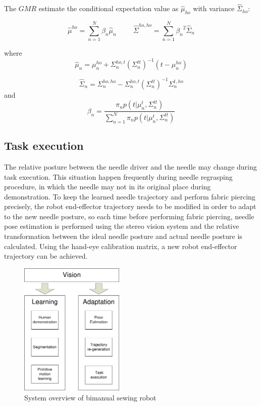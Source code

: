 The $GMR$ estimate the conditional expectation value as $\hat{\mu}_{ho}$ with variance $\hat{\Sigma}_{ho}$:

\begin{equation}
{
\hat{\mu}^{ho} = \sum_{n=1}^N{\beta_n}\hat{\mu}_{n}
}
\hspace{1cm}
{
\hat{\Sigma}^{ho,ho} = \sum_{n=1}^N{\beta_n}^2\hat{\Sigma}_{n}
}
\end{equation}

where
\begin{equation}
{
\hat{\mu}_{n} = {\mu}_{n}^{ho} + \Sigma_{n}^{ho,t}({\Sigma}_{n}^{tt})^{-1}(t-{\mu}_{n}^{ho})
}
\end{equation}

\begin{equation}
{
\hat{\Sigma}_{n} = {\Sigma}_{n}^{ho,ho} - {\Sigma}_{n}^{ho,t}({\Sigma}_{n}^{tt})^{-1}{\Sigma}_{n}^{t,ho}
}
\end{equation}
and
\begin{equation}
{
\beta_n = \frac{\pi_{n}p(t|{\mu}_{n}^t,{\Sigma}_{n}^{tt})}
{\sum_{n=1}^N{\pi_n}p(t|{\mu}_{n}^t,{\Sigma}_{n}^{tt})}
}
\end{equation}



\subsection{Task execution}

The relative posture between the needle driver and the needle may change during task execution. This situation happen frequently during needle regrasping procedure, in which the needle may not in its original place during demonstration. To keep the learned needle trajectory and perform fabric piercing precisely, the robot end-effector trajectory needs to be modified in order to adapt to the new needle posture, so each time before performing fabric piercing, needle pose estimation is performed using the stereo vision system and the relative transformation between the ideal needle posture and actual needle posture is calculated. Using the hand-eye calibration matrix, a new robot end-effector trajectory can be achieved.


\begin{figure}
\centering
{
\includegraphics[width=5cm]{./fig/overview.pdf}
\caption{\scriptsize{System overview of bimanual sewing robot}}

\label{fig:overview}
}
\end{figure}

